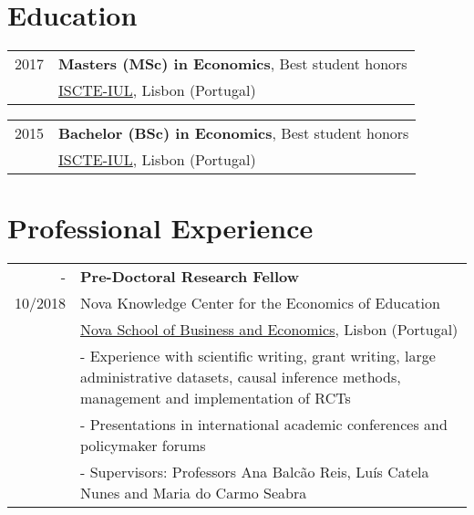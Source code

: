 \documentclass[a4paper,11pt]{article} %
\begin{document}

\section[Education]{\faGraduationCap \hspace{3pt} Education}

\begin{tabular}{r|p{13cm}}
	2017 & \textbf{Masters (MSc) in Economics}, Best student honors \\
	&  \href{https://iscte-iul.pt/}{ISCTE-IUL}, Lisbon (Portugal) \\
\end{tabular}

\begin{tabular}{r|p{15cm}}
	2015 & \textbf{Bachelor (BSc) in Economics}, Best student honors \\ & \href{https://iscte-iul.pt/}{ISCTE-IUL}, Lisbon (Portugal)\\
\end{tabular}

\section[Professional Experience]{\faBriefcase \hspace{3pt} Professional Experience}

\begin{tabular}{r|p{13cm}}
	- & \textbf{Pre-Doctoral Research Fellow} \\
	10/2018 & Nova Knowledge Center for the Economics of Education \\  & \href{https://www2.novasbe.unl.pt/en/}{Nova School of Business and Economics}, Lisbon (Portugal) \\
		& - Experience with scientific writing, grant writing, large administrative datasets, causal inference methods, management and implementation of RCTs\\
		& - Presentations in international academic conferences and policymaker forums \\
		& - Supervisors: Professors Ana Balcão Reis, Luís Catela Nunes and Maria do Carmo Seabra \\


\end{tabular}
\end{document}
